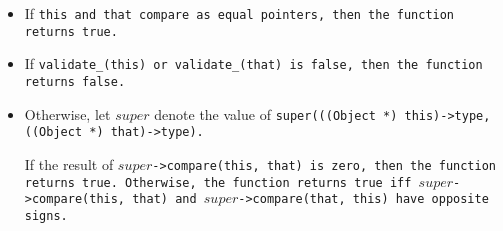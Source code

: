 \begin{itemize}[nosep]

\item If \tt{this} and \tt{that} compare as
equal pointers, then the function returns \tt{true}.

\item If \tt{validate_(this)} or \tt{validate_(that)}
is \tt{false}, then the function returns \tt{false}.

\item Otherwise, let $super$ denote the value of
\tt{super(((Object *) this)->type, ((Object *) that)->type)}.

If the result of $super$\tt{->compare(this, that)}
is zero, then the function returns \tt{true}.
Otherwise, the function returns \tt{true} iff $super$\tt{->compare(this, that)}
and $super$\tt{->compare(that, this)} have opposite signs.

\end{itemize}
